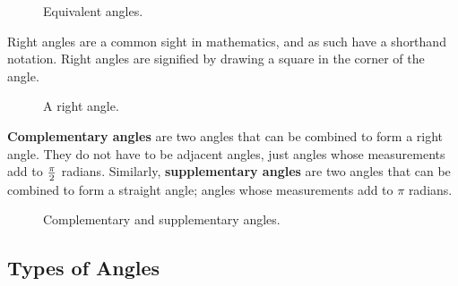 \begin{figure}[htb]
\center
\caption{Equivalent angles.}
\label{fig:positive_and_negative}
\end{figure}

Right angles are a common sight in mathematics, and as such have a shorthand notation.  Right angles are signified by drawing a square in the corner of the angle.\\

\begin{figure}[htb]
\center
\caption{A right angle.}
\label{fig:right_angles}
\end{figure}

{\bf Complementary angles} are two angles that can be combined to form a right angle.  They do not have to be adjacent angles, just angles whose measurements add to $\frac{\pi}{2}$ radians.  Similarly, {\bf supplementary angles} are two angles that can be combined to form a straight angle; angles whose measurements add to $\pi$ radians.

\begin{figure}[htb]
\center
\caption{Complementary and supplementary angles.}
\label{fig:comp_and_supp}
\end{figure}

\newpage

\subsection{Types of Angles}

